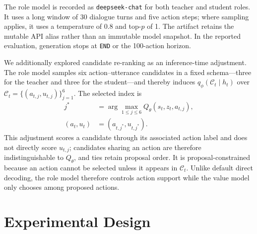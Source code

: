 \documentclass[manuscript,review,anonymous]{acmart}
\begin{document}
The role model is recorded as \texttt{deepseek-chat} for both teacher and
student roles. It uses a long window of 30 dialogue turns and five action steps;
where sampling applies, it uses a temperature of $0.8$ and top-$p$ of 1. The
artifact retains the mutable API alias rather than an immutable model snapshot.
In the reported evaluation, generation stops at \texttt{END} or the 100-action horizon.

We additionally explored candidate re-ranking as an inference-time adjustment. The role model samples six action--utterance candidates in a fixed schema---three for the teacher and three for the student---and thereby induces $q_\phi(\mathcal C_t\mid h_t)$ over $\mathcal{C}_t=\{(a_{t,j},u_{t,j})\}_{j=1}^{6}$. The selected index is
\begin{equation}
\begin{aligned}
j^*&=\arg\max_{1\leq j\leq 6}Q_\theta(s_t,z_t,a_{t,j}),\\
(a_t,u_t)&=(a_{t,j^*},u_{t,j^*}).
\end{aligned}
\label{eq:proposal-constrained-selection}
\end{equation}
This adjustment scores a candidate through its associated action label and does not directly score $u_{t,j}$; candidates sharing an action are therefore indistinguishable to $Q_\theta$, and ties retain proposal order. It is proposal-constrained because an action cannot be selected unless it appears in $\mathcal C_t$. Unlike default direct decoding, the role model therefore controls action support while the value model only chooses among proposed actions.

\section{Experimental Design}
\label{sec:experiments}
\end{document}
